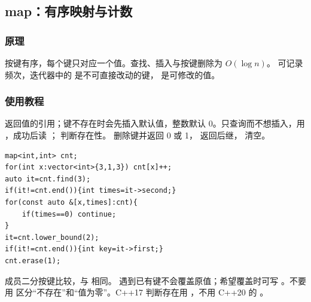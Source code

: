 \subsection{map：有序映射与计数}
\label{stl:map}
\subsubsection*{原理}
 按键有序，每个键只对应一个值。查找、插入与按键删除为 $O(\log n)$。 可记录频次，迭代器中的  是不可直接改动的键， 是可修改的值。
\subsubsection*{使用教程}
 返回值的引用；键不存在时会先插入默认值，整数默认 0。只查询而不想插入，用 ，成功后读 ； 判断存在性。 删除键并返回 0 或 1， 返回后继， 清空。
\begin{lstlisting}[style=mtycpp,numbers=none]
map<int,int> cnt;
for(int x:vector<int>{3,1,3}) cnt[x]++;
auto it=cnt.find(3);
if(it!=cnt.end()){int times=it->second;}
for(const auto &[x,times]:cnt){
	if(times==0) continue;
}
it=cnt.lower_bound(2);
if(it!=cnt.end()){int key=it->first;}
cnt.erase(1);
\end{lstlisting}
成员二分按键比较，与  相同。 遇到已有键不会覆盖原值；希望覆盖时可写 。不要用  区分“不存在”和“值为零”。C++17 判断存在用 ，不用 C++20 的 。
